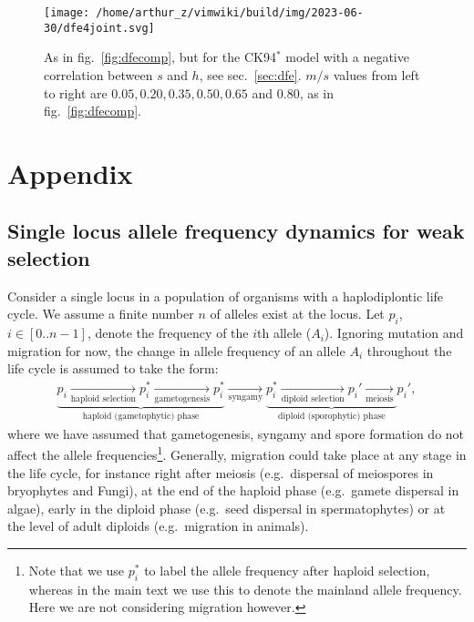 \documentclass[
  11pt,
]{article}
\begin{document}
\begin{figure}
\hypertarget{fig:dfe4}{%
\centering
\texttt{[image: /home/arthur\_z/vimwiki/build/img/2023-06-30/dfe4joint.svg]}
\caption{As in fig.~\ref{fig:dfecomp}, but for the CK94\(^\ast\) model
with a negative correlation between \(s\) and \(h\), see
sec.~\ref{sec:dfe}. \(m/s\) values from left to right are
\(0.05, 0.20, 0.35, 0.50, 0.65\) and \(0.80\), as in
fig.~\ref{fig:dfecomp}.}\label{fig:dfe4}
}
\end{figure}

\clearpage

\hypertarget{appendix}{%
\section{Appendix}\label{appendix}}

\hypertarget{single-locus-allele-frequency-dynamics-for-weak-selection}{%
\subsection{\texorpdfstring{Single locus allele frequency dynamics for
weak selection
\label{sec:app1}}{Single locus allele frequency dynamics for weak selection }}\label{single-locus-allele-frequency-dynamics-for-weak-selection}}

Consider a single locus in a population of organisms with a
haplodiplontic life cycle. We assume a finite number \(n\) of alleles
exist at the locus. Let \(p_i\), \(i \in [0..n-1]\), denote the
frequency of the \(i\)th allele (\(A_i\)). Ignoring mutation and
migration for now, the change in allele frequency of an allele \(A_i\)
throughout the life cycle is assumed to take the form: \begin{align}
  \underbrace{
  p_i \underset{\text{haploid selection}}{\longrightarrow}
  p_i^\ast \underset{\text{gametogenesis}}{\longrightarrow}
  p_i^\ast }_{\text{haploid (gametophytic) phase}} 
  \underset{\text{syngamy}}{\longrightarrow}
  \underbrace{p_i^\ast \underset{\text{diploid selection}}{\longrightarrow}
  p_i' \underset{\text{meiosis}}
  {\longrightarrow}}_{\text{diploid (sporophytic) phase}} 
  p_i',
\end{align} where we have assumed that gametogenesis, syngamy and spore
formation do not affect the allele frequencies\footnote{Note that we use
  \(p_i^\ast\) to label the allele frequency after haploid selection,
  whereas in the main text we use this to denote the mainland allele
  frequency. Here we are not considering migration however.}. Generally,
migration could take place at any stage in the life cycle, for instance
right after meiosis (e.g.~dispersal of meiospores in bryophytes and
Fungi), at the end of the haploid phase (e.g.~gamete dispersal in
algae), early in the diploid phase (e.g.~seed dispersal in
spermatophytes) or at the level of adult diploids (e.g.~migration in
animals).
\end{document}

